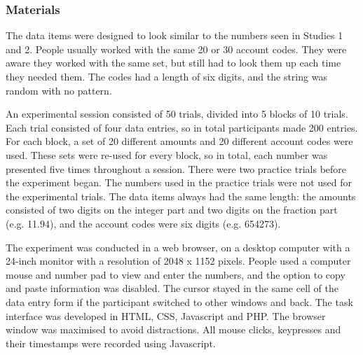 \begin{table}
\begin{itemize}


\subsubsection{Materials}
The data items were designed to look similar to the numbers seen in Studies 1 and 2. People usually worked with the same 20 or 30 account codes. They were aware they worked with the same set, but still had to look them up each time they needed them. The codes had a length of six digits, and the string was random with no pattern. 

An experimental session consisted of 50 trials, divided into 5 blocks of 10 trials.  Each trial consisted of four data entries, so in total participants made 200 entries. For each block, a set of 20 different amounts and 20 different account codes were used. These sets were re-used for every block, so in total, each number was presented five times throughout a session. There were two practice trials before the experiment began. The numbers used in the practice trials were not used for the experimental trials. The data items always had the same length: the amounts consisted of two digits on the integer part and two digits on the fraction part (e.g. 11.94), and the account codes were six digits (e.g. 654273).

The experiment was conducted in a web browser, on a desktop computer with a 24-inch monitor with a resolution of 2048 x 1152 pixels. People used a computer mouse and number pad to view and enter the numbers, and the option to copy and paste information was disabled. The cursor stayed in the same cell of the data entry form if the participant switched to other windows and back. The task interface was developed in HTML, CSS, Javascript and PHP. The browser window was maximised to avoid distractions. All mouse clicks, keypresses and their timestamps were recorded using Javascript. 


\end{itemize}
\end{table}
